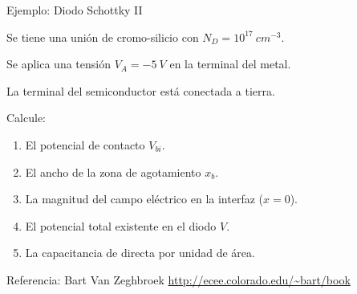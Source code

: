 \documentclass[10pt,t,aspectratio=169]{beamer}
\begin{document}
\begin{frame}{Ejemplo: Diodo Schottky II}

Se tiene una unión de cromo-silicio con $N_D = 10^{17}\ cm^{-3}$.

Se aplica una tensión $V_A = -5\ V$ en la terminal del metal.

La terminal del semiconductor está conectada a tierra.

\vspace{5mm}
Calcule:

\begin{enumerate}
    \item El potencial de contacto $V_{bi}$.
    \item El ancho de la zona de agotamiento $x_b$.
    \item La magnitud del campo eléctrico en la interfaz ($x=0$).
    \item El potencial total existente en el diodo $V$.
    \item La capacitancia de directa por unidad de área.
\end{enumerate}

\vspace{5mm}
Referencia: Bart Van Zeghbroek \url{http://ecee.colorado.edu/~bart/book}

\end{frame}
\end{document}
